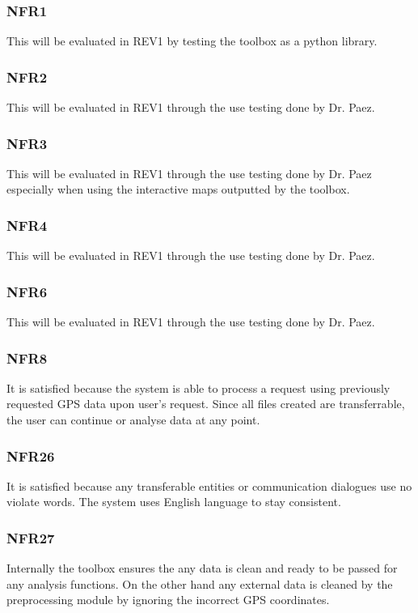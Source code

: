\documentclass[12pt, titlepage]{article}
\begin{document}
\subsubsection{NFR1}
This will be evaluated in REV1 by testing the toolbox as a python library. 
\subsubsection{NFR2}
This will be evaluated in REV1 through the use testing done by Dr. Paez. 
\subsubsection{NFR3}
This will be evaluated in REV1 through the use testing done by Dr. Paez especially when using the interactive maps outputted by the toolbox.
\subsubsection{NFR4}
This will be evaluated in REV1 through the use testing done by Dr. Paez.
\subsubsection{NFR6}
This will be evaluated in REV1 through the use testing done by Dr. Paez.
\subsubsection{NFR8}
It is satisfied because the system is able to process a request using previously requested GPS data upon user’s request. Since all files created are transferrable, the user can continue or analyse data at any point.
\subsubsection{NFR26}
It is satisfied because any transferable entities or communication dialogues use no violate words. The system uses English language to stay consistent.
\subsubsection{NFR27}
Internally the toolbox ensures the any data is clean and ready to be passed for any analysis functions. On the other hand any external data is cleaned by the preprocessing module by ignoring the incorrect GPS coordinates. 
		
\end{document}
